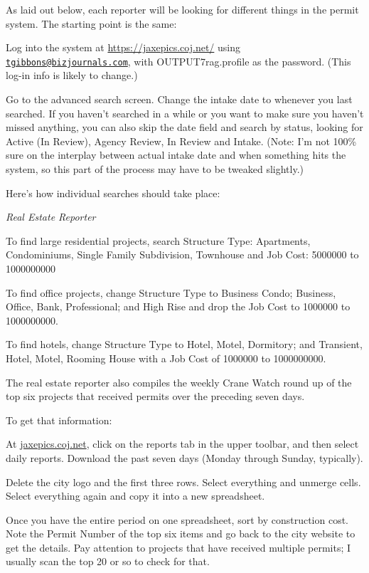 \documentclass[
  11pt,
  american,
  letterpaperpaper,
  extrafontsizes,onecolumn,openright
  ]{memoir}
\begin{document}
As laid out below, each reporter will be looking for different things in the permit system. The starting point is the same:

Log into the system at \url{https://jaxepics.coj.net/} using \href{mailto:tgibbons@bizjournals.com}{\nolinkurl{tgibbons@bizjournals.com}}, with OUTPUT7rag.profile as the password. (This log-in info is likely to change.)

Go to the advanced search screen. Change the intake date to whenever you last searched. If you haven't searched in a while or you want to make sure you haven't missed anything, you can also skip the date field and search by status, looking for Active (In Review), Agency Review, In Review and Intake. (Note: I'm not 100\% sure on the interplay between actual intake date and when something hits the system, so this part of the process may have to be tweaked slightly.)

Here's how individual searches should take place:

\emph{Real Estate Reporter}

To find large residential projects, search Structure Type: Apartments, Condominiums, Single Family Subdivision, Townhouse and Job Cost: 5000000 to 1000000000

To find office projects, change Structure Type to Business Condo; Business, Office, Bank, Professional; and High Rise and drop the Job Cost to 1000000 to 1000000000.

To find hotels, change Structure Type to Hotel, Motel, Dormitory; and Transient, Hotel, Motel, Rooming House with a Job Cost of 1000000 to 1000000000.

The real estate reporter also compiles the weekly Crane Watch round up of the top six projects that received permits over the preceding seven days.

To get that information:

At \href{https://jaxepics.coj.net/}{jaxepics.coj.net}, click on the reports tab in the upper toolbar, and then select daily reports. Download the past seven days (Monday through Sunday, typically).

Delete the city logo and the first three rows. Select everything and unmerge cells. Select everything again and copy it into a new spreadsheet.

Once you have the entire period on one spreadsheet, sort by construction cost. Note the Permit Number of the top six items and go back to the city website to get the details. Pay attention to projects that have received multiple permits; I usually scan the top 20 or so to check for that.
\end{document}
